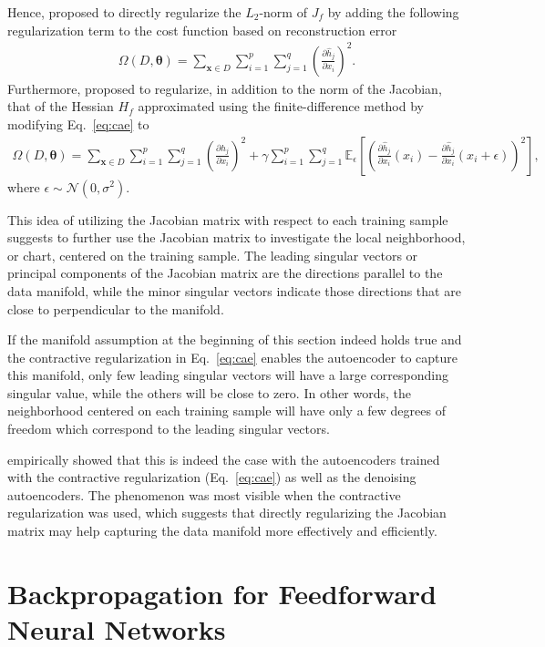 \documentclass{now}
\newcommand{\vect}[1]{\mathbf{#1}}
\newcommand{\vects}[1]{\boldsymbol{#1}}
\newcommand{\vx}[0]{\vect{x}}
\newcommand{\TT}[0]{{\vects{\theta}}}
\newcommand{\N}[0]{\mathcal{N}}
\newcommand{\E}[0]{\mathbb{E}}
\begin{document}
Hence, \citet{Rifai2011} proposed to directly regularize the $L_2$-norm of $J_f$
by adding the following regularization term to the cost function based on
reconstruction error
\begin{align}
    \label{eq:cae}
    \Omega(D, \TT) = \sum_{\vx \in D} \sum_{i=1}^p \sum_{j=1}^q
    \left( \frac{\partial \hat{h}_j}{\partial x_i}
    \right)^2.
\end{align}
Furthermore, \citet{Rifai2011ho} proposed to regularize, in addition to the norm
of the Jacobian, that of the Hessian $H_f$ approximated using the
finite-difference method by modifying Eq.~\eqref{eq:cae} to
\begin{align*}
    \Omega(D, \TT) = \sum_{\vx \in D} \sum_{i=1}^p \sum_{j=1}^q
    \left( \frac{\partial \hat{h}_j}{\partial x_i}
    \right)^2 + \gamma \sum_{i=1}^p \sum_{j=1}^q \E_{\epsilon} \left[ 
    \left( \frac{\partial \hat{h}_j}{\partial x_i}(x_i)
    - \frac{\partial \hat{h}_j}{\partial x_i}(x_i +
    \epsilon)
    \right)^2
    \right],
\end{align*}
where $\epsilon \sim \N(0, \sigma^2)$.

This idea of utilizing the Jacobian matrix with respect to each training sample
suggests to further use the Jacobian matrix to investigate the local
neighborhood, or chart, centered on the training sample. The leading singular
vectors or principal components of the Jacobian matrix are the directions
parallel to the data manifold, while the minor singular vectors indicate those
directions that are close to perpendicular to the manifold.

If the manifold assumption at the beginning of this section indeed holds true
and the contractive regularization in Eq.~\eqref{eq:cae} enables the autoencoder
to capture this manifold, only few leading singular vectors will have a large
corresponding singular value, while the others will be close to zero. In other
words, the neighborhood centered on each training sample will have only a few
degrees of freedom which correspond to the leading singular vectors.

\citet{Rifai2011} empirically showed that this is indeed the case with the
autoencoders trained with the contractive regularization (Eq.~\eqref{eq:cae}) as
well as the denoising autoencoders. The phenomenon was most visible when the
contractive regularization was used, which suggests that directly regularizing
the Jacobian matrix may help capturing the data manifold more effectively and
efficiently.

\section{Backpropagation for Feedforward Neural Networks}
\label{sec:backprop}
\end{document}

